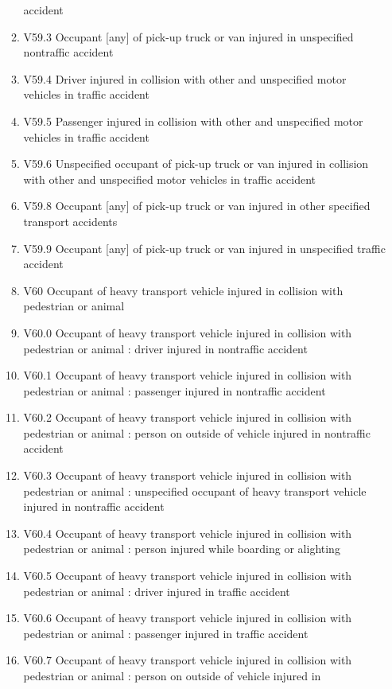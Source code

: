 \documentclass[
]{scrartcl}
\begin{document}
\begin{itemize}
\begin{enumerate}
    accident
  \item
    V59.3 Occupant {[}any{]} of pick-up truck or van injured in
    unspecified nontraffic accident
  \item
    V59.4 Driver injured in collision with other and unspecified motor
    vehicles in traffic accident
  \item
    V59.5 Passenger injured in collision with other and unspecified
    motor vehicles in traffic accident
  \item
    V59.6 Unspecified occupant of pick-up truck or van injured in
    collision with other and unspecified motor vehicles in traffic
    accident
  \item
    V59.8 Occupant {[}any{]} of pick-up truck or van injured in other
    specified transport accidents
  \item
    V59.9 Occupant {[}any{]} of pick-up truck or van injured in
    unspecified traffic accident
  \item
    V60 Occupant of heavy transport vehicle injured in collision with
    pedestrian or animal
  \item
    V60.0 Occupant of heavy transport vehicle injured in collision with
    pedestrian or animal : driver injured in nontraffic accident
  \item
    V60.1 Occupant of heavy transport vehicle injured in collision with
    pedestrian or animal : passenger injured in nontraffic accident
  \item
    V60.2 Occupant of heavy transport vehicle injured in collision with
    pedestrian or animal : person on outside of vehicle injured in
    nontraffic accident
  \item
    V60.3 Occupant of heavy transport vehicle injured in collision with
    pedestrian or animal : unspecified occupant of heavy transport
    vehicle injured in nontraffic accident
  \item
    V60.4 Occupant of heavy transport vehicle injured in collision with
    pedestrian or animal : person injured while boarding or alighting
  \item
    V60.5 Occupant of heavy transport vehicle injured in collision with
    pedestrian or animal : driver injured in traffic accident
  \item
    V60.6 Occupant of heavy transport vehicle injured in collision with
    pedestrian or animal : passenger injured in traffic accident
  \item
    V60.7 Occupant of heavy transport vehicle injured in collision with
    pedestrian or animal : person on outside of vehicle injured in

\end{enumerate}
\end{itemize}
\end{document}
